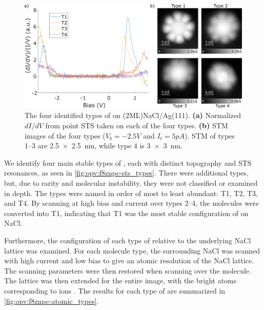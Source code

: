 


\begin{figure} [h]
    \centering
        \includegraphics[width=\textwidth]{pictures/4types_images.png}
    \caption{The four identified types of  on (2ML)NaCl/Ag(111). \textbf{(a)} Normalized $dI/dV$ from point STS taken on each of the four types. \textbf{(b)} STM images of the four types ($V_b = -2.5V$ and $I_t = 5pA$). STM of types 1--3 are \SI{2.5x2.5}{nm}, while type 4 is \SI{3x3}{nm}. }
    \label{fig:opv:f8znpc-sts_types}
\end{figure}

We identify four main stable types of , each with distinct topography and \ac{STS} resonances, as seen in \autoref{fig:opv:f8znpc-sts_types}. There were additional types, but, due to rarity and molecular instability, they were not classified or examined in depth. The types were named in order of most to least abundant: T1, T2, T3, and T4. By scanning at high bias and current over types 2--4, the molecules were converted into T1, indicating that T1 was the most stable configuration of  on NaCl. 

Furthermore, the configuration of each type of  relative to the underlying NaCl lattice was examined. For each molecule type, the surrounding NaCl was scanned with high current and low bias to give an atomic resolution of the NaCl lattice. The scanning parameters were then restored when scanning over the molecule. The lattice was then extended for the entire image, with the bright atoms corresponding to  ions \citep{heidorn2013influence}. The results for each type of  are summarized in \autoref{fig:opv:f8znpc-atomic_types}.

